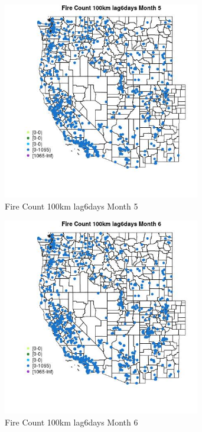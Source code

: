 \begin{figure} 
\centering  
\includegraphics[width=0.77\textwidth]{Code_Outputs/Report_ML_input_PM25_Step4_part_f_de_duplicated_aves_prioritize_24hr_obswNAs_MapObsMo5Fire_Count_100km_lag6days.jpg} 
\caption{\label{fig:Report_ML_input_PM25_Step4_part_f_de_duplicated_aves_prioritize_24hr_obswNAsMapObsMo5Fire_Count_100km_lag6days}Fire Count 100km lag6days Month 5} 
\end{figure} 
 

\clearpage 

\begin{figure} 
\centering  
\includegraphics[width=0.77\textwidth]{Code_Outputs/Report_ML_input_PM25_Step4_part_f_de_duplicated_aves_prioritize_24hr_obswNAs_MapObsMo6Fire_Count_100km_lag6days.jpg} 
\caption{\label{fig:Report_ML_input_PM25_Step4_part_f_de_duplicated_aves_prioritize_24hr_obswNAsMapObsMo6Fire_Count_100km_lag6days}Fire Count 100km lag6days Month 6} 
\end{figure} 
 

